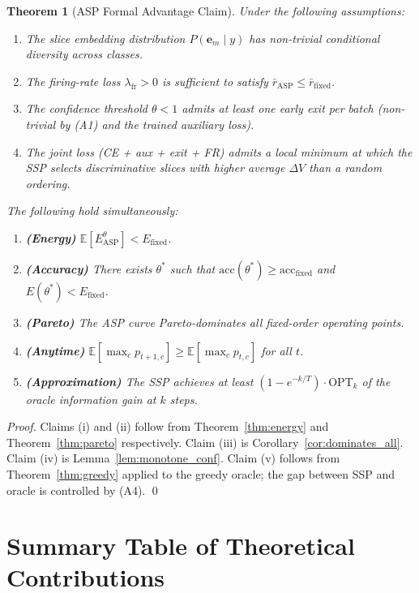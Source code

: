 \documentclass[11pt,a4paper]{article}
\newtheorem{theorem}{Theorem}[section]
\newcommand{\be}{\mathbf{e}}
\newcommand{\EE}{\mathbb{E}}
\newcommand{\rbar}{\bar{r}}
\begin{document}
\begin{theorem}[ASP Formal Advantage Claim]
\label{thm:main}
Under the following assumptions:
\begin{enumerate}[label=(A\arabic*)]
  \item The slice embedding distribution $P(\be_m \mid y)$ has non-trivial
    conditional diversity across classes.
  \item The firing-rate loss $\lambda_\mathrm{fr} > 0$ is sufficient to satisfy
    $\rbar_\mathrm{ASP} \leq \rbar_\mathrm{fixed}$.
  \item The confidence threshold $\theta < 1$ admits at least one early exit
    per batch (non-trivial by (A1) and the trained auxiliary loss).
  \item The joint loss (CE + aux + exit + FR) admits a local minimum at which
    the SSP selects discriminative slices with higher average $\Delta V$ than
    a random ordering.
\end{enumerate}
The following hold simultaneously:
\begin{enumerate}[label=(\roman*)]
  \item \textbf{(Energy)} $\EE[E^\theta_\mathrm{ASP}] < E_\mathrm{fixed}$.
  \item \textbf{(Accuracy)} There exists $\theta^*$ such that
    $\mathrm{acc}(\theta^*) \geq \mathrm{acc}_\mathrm{fixed}$ and $E(\theta^*) < E_\mathrm{fixed}$.
  \item \textbf{(Pareto)} The ASP curve Pareto-dominates all fixed-order operating points.
  \item \textbf{(Anytime)} $\EE[\max_c p_{t+1,c}] \geq \EE[\max_c p_{t,c}]$
    for all $t$.
  \item \textbf{(Approximation)} The SSP achieves at least
    $(1 - e^{-k/T}) \cdot \mathrm{OPT}_k$ of the oracle information gain at $k$ steps.
\end{enumerate}
\end{theorem}

\begin{proof}
Claims (i) and (ii) follow from Theorem~\ref{thm:energy} and
Theorem~\ref{thm:pareto} respectively.  Claim (iii) is Corollary~\ref{cor:dominates_all}.
Claim (iv) is Lemma~\ref{lem:monotone_conf}.  Claim (v) follows from
Theorem~\ref{thm:greedy} applied to the greedy oracle; the gap between SSP and
oracle is controlled by (A4).  \qed
\end{proof}

\section{Summary Table of Theoretical Contributions}
\end{document}
